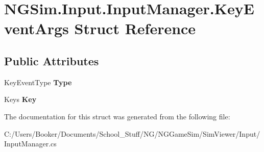 \hypertarget{struct_n_g_sim_1_1_input_1_1_input_manager_1_1_key_event_args}{}\section{N\+G\+Sim.\+Input.\+Input\+Manager.\+Key\+Event\+Args Struct Reference}
\label{struct_n_g_sim_1_1_input_1_1_input_manager_1_1_key_event_args}
\subsection*{Public Attributes}
\begin{DoxyCompactItemize}
\item 
\mbox{\label{struct_n_g_sim_1_1_input_1_1_input_manager_1_1_key_event_args_a7a78fbc9aa5a3bbe675a88450e222541}} 
Key\+Event\+Type {\bfseries Type}
\item 
\mbox{\label{struct_n_g_sim_1_1_input_1_1_input_manager_1_1_key_event_args_ada0075d9ad01e64523b608fdc92fc4ed}} 
Keys {\bfseries Key}
\end{DoxyCompactItemize}


The documentation for this struct was generated from the following file\+:\begin{DoxyCompactItemize}
\item 
C\+:/\+Users/\+Booker/\+Documents/\+School\+\_\+\+Stuff/\+N\+G/\+N\+G\+Game\+Sim/\+Sim\+Viewer/\+Input/Input\+Manager.\+cs\end{DoxyCompactItemize}
